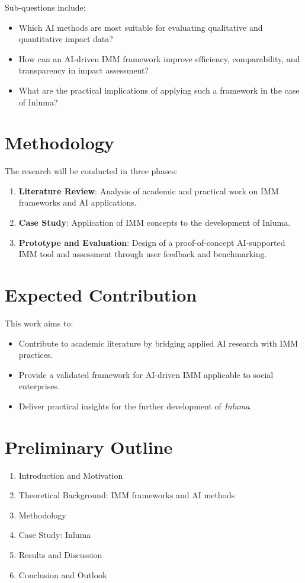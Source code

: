 \documentclass[a4paper,12pt]{article}
\begin{document}
Sub-questions include:
\begin{itemize}
    \item Which AI methods are most suitable for evaluating qualitative and quantitative impact data?
    \item How can an AI-driven IMM framework improve efficiency, comparability, and transparency in impact assessment?
    \item What are the practical implications of applying such a framework in the case of Inluma?
\end{itemize}

\section{Methodology}\label{sec:methodology}
The research will be conducted in three phases:
\begin{enumerate}
    \item \textbf{Literature Review}: Analysis of academic and practical work on IMM frameworks and AI applications.
    \item \textbf{Case Study}: Application of IMM concepts to the development of Inluma.
    \item \textbf{Prototype and Evaluation}: Design of a proof-of-concept AI-supported IMM tool and assessment through user feedback and benchmarking.
\end{enumerate}

\section{Expected Contribution}\label{sec:expected-contribution}
This work aims to:
\begin{itemize}
    \item Contribute to academic literature by bridging applied AI research with IMM practices.
    \item Provide a validated framework for AI-driven IMM applicable to social enterprises.
    \item Deliver practical insights for the further development of \textit{Inluma}.
\end{itemize}

\section{Preliminary Outline}\label{sec:preliminary-outline}
\begin{enumerate}
    \item Introduction and Motivation
    \item Theoretical Background: IMM frameworks and AI methods
    \item Methodology
    \item Case Study: Inluma
    \item Results and Discussion
    \item Conclusion and Outlook
\end{enumerate}
\end{document}
